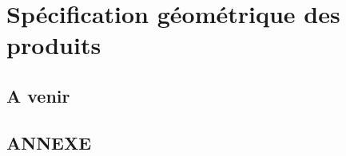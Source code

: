\documentclass[
	11pt, %
	fleqn, %
	a4paper, %
]{LegrandOrangeBook}
\begin{document}

\chapter{Spécification géométrique des produits}
\section{A venir}





\chapterspaceabove{6.25cm} %
\chapterspacebelow{7.5cm} %



	




\newpage
\section{ANNEXE}



{} %
\printindex %
\end{document}

